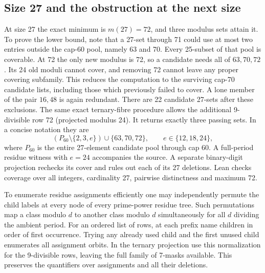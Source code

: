 \subsection*{Size 27 and the obstruction at the next size}
At size 27 the exact minimum is $m(27)=72$, and three modulus sets attain it. To prove the lower bound, note that a 27-set through 71 could use at most two entries outside the cap-60 pool, namely 63 and 70. Every 25-subset of that pool is coverable. At 72 the only new modulus is 72, so a candidate needs all of $63,70,72$. Its 24 old moduli cannot cover, and removing 72 cannot leave any proper covering subfamily. This reduces the computation to the surviving cap-70 candidate lists, including those which previously failed to cover. A lone member of the pair $16,48$ is again redundant. There are 22 candidate 27-sets after these exclusions. The same exact ternary-fibre procedure allows the additional 9-divisible row 72 (projected modulus 24). It returns exactly three passing sets. In a concise notation they are
\[
 (P_{60}\setminus\{2,3,e\})\cup\{63,70,72\},
 \qquad e\in\{12,18,24\},
\]
where $P_{60}$ is the entire 27-element candidate pool through cap 60. A full-period residue witness with $e=24$ accompanies the source. A separate binary-digit projection rechecks its cover and rules out each of its 27 deletions. Lean checks coverage over all integers, cardinality 27, pairwise distinctness and maximum 72.

To enumerate residue assignments efficiently one may independently permute the child labels at every node of every prime-power residue tree. Such permutations map a class modulo $d$ to another class modulo $d$ simultaneously for all $d$ dividing the ambient period. For an ordered list of rows, at each prefix name children in order of first occurrence. Trying any already used child and the first unused child enumerates all assignment orbits. In the ternary projection use this normalization for the 9-divisible rows, leaving the full family of 7-masks available. This preserves the quantifiers over assignments and all their deletions.

